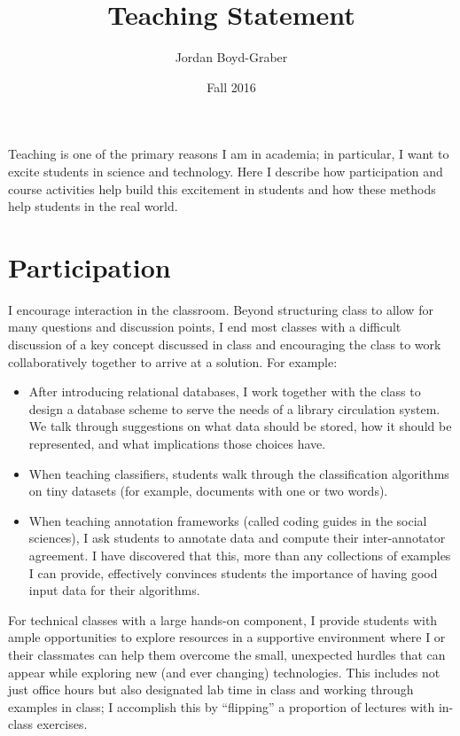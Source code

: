 \documentclass[11pt]{amsart}
\begin{document}
 \title{Teaching Statement}

 \author{Jordan Boyd-Graber}
\address{University of Colorado}

\date{Fall 2016}


\keywords{}

\maketitle

Teaching is one of the primary reasons I am in academia; in particular, I want
to excite students in science and technology. Here I describe how
participation and course activities help build this excitement in students and
how these methods help students in the real world.

\section{Participation}

I encourage interaction in the classroom.  Beyond structuring class to allow for
many questions and discussion points, I end most classes with a difficult
discussion of a key concept discussed in class and encouraging the class to work
collaboratively together to arrive at a solution.  For example:
\begin{itemize}
  \item After introducing relational databases, I work together with the class to
design a database scheme to serve the needs of a library circulation
system.  We talk through suggestions on what data should be stored,
how it should be represented, and what implications those choices
have.
  \item When teaching classifiers, students walk through the classification
    algorithms on tiny datasets (for example, documents with one or two words).
  \item When teaching annotation frameworks (called coding guides in the
    social sciences), I ask students to annotate data and
    compute their inter-annotator agreement.  I have discovered that this, more
    than any collections of examples I can provide, effectively convinces
    students the importance of having good input data for their algorithms.
\end{itemize}

For technical classes with a large hands-on component, I provide students with
ample opportunities to explore resources in a supportive environment where I or
their classmates can help them overcome the small, unexpected hurdles that can
appear while exploring new (and ever changing) technologies.  This includes not
just office hours but also designated lab time in class and working through
examples in class; I accomplish this by ``flipping'' a proportion of lectures
with in-class exercises.
\end{document}
